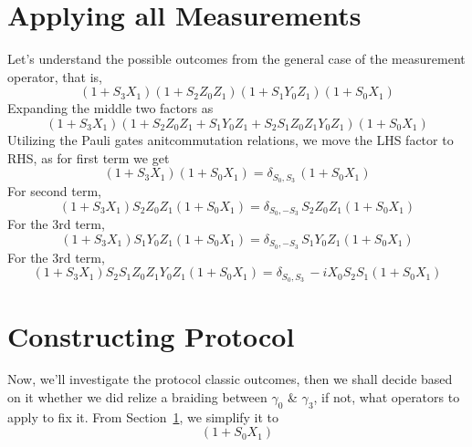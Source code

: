 \documentclass{article}
\begin{document}
\section{Applying all Measurements} %
\label{sec:Applying all Measurements}
Let's understand the possible outcomes from the general case of the measurement operator,
that is,
\begin{equation}
	(1 +S_3 X_1) (1 +S_2 Z_0 Z_1) (1 +S_1 Y_0 Z_1) (1 +S_0 X_1)
	\label{eq:general meas}
\end{equation}
Expanding the middle two factors as
\begin{equation}
	(1 +S_3 X_1) (1 + S_2 Z_0 Z_1 + S_1 Y_0 Z_1 + S_2 S_1 Z_0 Z_1 Y_0 Z_1) (1 +S_0 X_1)
	\label{eq:expanding}
\end{equation}
Utilizing the Pauli gates anitcommutation relations, we move the LHS factor to RHS,
as for first term we get
\begin{equation*}
	(1 +S_3 X_1) (1 +S_0 X_1) = \delta_{S_0,S_3}\, (1 +S_0 X_1)
\end{equation*}
For second term,
\begin{equation*}
	(1 +S_3 X_1) S_2 Z_0 Z_1 (1 +S_0 X_1) = \delta_{S_0,-S_3}\, S_2 Z_0 Z_1 (1 +S_0 X_1)
\end{equation*}
For the 3rd term,
\begin{equation*}
	(1 +S_3 X_1) S_1 Y_0 Z_1 (1 +S_0 X_1) = \delta_{S_0,-S_3}\, S_1 Y_0 Z_1 (1 +S_0 X_1)
\end{equation*}
For the 3rd term,
\begin{equation*}
	(1 +S_3 X_1) S_2 S_1 Z_0 Z_1 Y_0 Z_1 (1 +S_0 X_1) = \delta_{S_0,S_3}\, -i X_0 S_2 S_1 (1 +S_0 X_1)
\end{equation*}

\section{Constructing Protocol} %
\label{sec:Constructing Protocol}
Now, we'll investigate the protocol classic outcomes, then we shall decide based on it whether
we did relize a braiding between $ \gamma_0 $ \& $ \gamma_3 $, if not, what operators
to apply to fix it. From Section~\ref{sec:Applying all Measurements}, we simplify it to
\begin{equation*}
	[
		\delta_{S_0,S_3} + \delta_{S_0,-S_3}\, S_2 Z_0 Z_1
		+ \delta_{S_0,-S_3}\, S_1 Y_0 Z_1 + \delta_{S_0,S_3}\, -i X_0 S_2 S_1
	] (1 +S_0 X_1)
\end{equation*}
\end{document}
